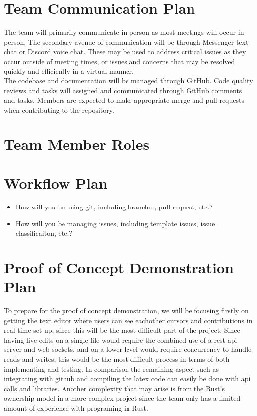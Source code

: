 \documentclass{article}
\begin{document}
\section{Team Communication Plan}

	The team will primarily communicate in person as most meetings will occur in person. The secondary avenue of communication will be through Messenger text chat or Discord voice chat. These may be used to address critical issues as they occur outside of meeting times, or issues and concerns that may be resolved quickly and efficiently in a virtual manner. \\
	The codebase and documentation will be managed through GitHub. Code quality reviews and tasks will assigned and communicated through GitHub comments and tasks. Members are expected to make appropriate merge and pull requests when contributing to the repository.

\section{Team Member Roles}

\section{Workflow Plan}

\begin{itemize}
	\item How will you be using git, including branches, pull request, etc.?
	\item How will you be managing issues, including template issues, issue
	classificaiton, etc.?
\end{itemize}

\section{Proof of Concept Demonstration Plan}

To prepare for the proof of concept demonstration, we will be focusing firstly on getting the text editor where users can see eachother cursors and contributions in real time set up, since this will be the most difficult part of the project.
Since having live edits on a single file would require the combined use of a rest api server and web sockets, and on a lower level would require concurrency to handle reads and writes, this would be the most difficult process in terms of 
both implementing and testing. In comparison the remaining aspect such as integrating with github and compiling the latex code can easily be done with api calls and libraries. Another complexity that may arise is from the Rust's ownership
model in a more complex project since the team only has a limited amount of experience with programing in Rust.\\
\end{document}
